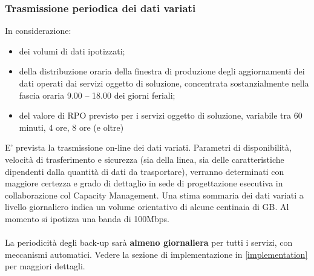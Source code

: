 \subsubsection{Trasmissione periodica dei dati variati} In considerazione:
\begin{itemize}
\item dei volumi di dati ipotizzati;
\item della distribuzione oraria della finestra di produzione degli aggiornamenti dei dati operati dai servizi oggetto di 
soluzione, concentrata sostanzialmente nella fascia oraria 9.00 – 18.00 dei giorni feriali;
\item del valore di RPO previsto per i servizi oggetto di
 soluzione, variabile tra 60 minuti, 4 ore, 8 ore (e oltre)
\end{itemize}
E' prevista la trasmissione on-line dei dati variati. Parametri di disponibilità, velocità di trasferimento e sicurezza (sia della linea, sia delle caratteristiche dipendenti dalla quantità di dati da trasportare), verranno determinati con maggiore certezza e grado di dettaglio in sede di progettazione esecutiva in collaborazione col Capacity Management. Una stima sommaria dei dati variati a livello giornaliero indica un volume orientativo di alcune centinaia di GB. Al momento si ipotizza una banda di 100Mbps.\\ 	\\
La periodicità degli back-up sarà \textbf{almeno giornaliera} per tutti i servizi, con meccanismi automatici. 
Vedere la sezione di implementazione in \ref{implementation} per maggiori dettagli.

